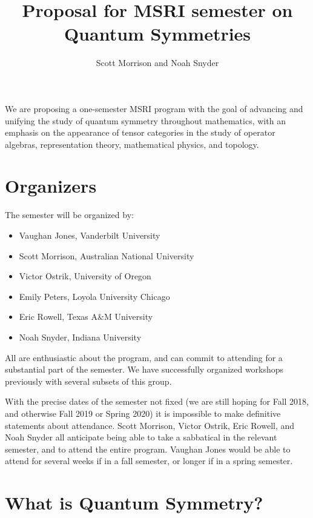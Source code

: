 \documentclass[12pt]{article}
\title{Proposal for MSRI semester on \textbf{Quantum Symmetries}}
\author{Scott Morrison and Noah Snyder}
\begin{document}
\maketitle



We are proposing a one-semester MSRI program with the goal of advancing and unifying the study of quantum symmetry throughout mathematics, with an emphasis on the appearance of tensor categories in the study of operator algebras, representation theory, mathematical physics, and topology.

\section{Organizers}
The semester will be organized by:
\begin{itemize}
  \setlength{\itemsep}{1pt}
  \setlength{\parskip}{0pt}
  \setlength{\parsep}{0pt}
\item Vaughan Jones, Vanderbilt University
\item Scott Morrison, Australian National University
\item Victor Ostrik, University of Oregon
\item Emily Peters, Loyola University Chicago
\item Eric Rowell, Texas A\&M University
\item Noah Snyder, Indiana University
\end{itemize}
All are enthusiastic about the program, and can commit to attending for a substantial part of the semester. We have successfully organized workshops previously with several subsets of this group.

With the precise dates of the semester not fixed (we are still hoping for Fall 2018, and otherwise Fall 2019 or Spring 2020) it is impossible to make definitive statements about attendance.
Scott Morrison, Victor Ostrik, Eric Rowell, and  Noah Snyder all anticipate being able to take a sabbatical in the relevant semester, and to attend the entire program. Vaughan Jones would be able to attend for several weeks if in a fall semester, or longer if in a spring semester.

\section{What is Quantum Symmetry?}
\end{document}
